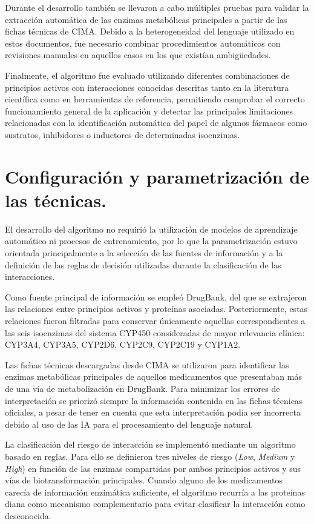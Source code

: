 Durante el desarrollo también se llevaron a cabo múltiples pruebas para validar la extracción automática de las enzimas metabólicas principales a partir de las fichas técnicas de CIMA. Debido a la heterogeneidad del lenguaje utilizado en estos documentos, fue necesario combinar procedimientos automáticos con revisiones manuales en aquellos casos en los que existían ambigüedades.

Finalmente, el algoritmo fue evaluado utilizando diferentes combinaciones de principios activos con interacciones conocidas descritas tanto en la literatura científica como en herramientas de referencia, permitiendo comprobar el correcto funcionamiento general de la aplicación y detectar las principales limitaciones relacionadas con la identificación automática del papel de algunos fármacos como sustratos, inhibidores o inductores de determinadas isoenzimas.

\section{Configuración y parametrización de las técnicas.}

El desarrollo del algoritmo no requirió la utilización de modelos de aprendizaje automático ni procesos de entrenamiento, por lo que la parametrización estuvo orientada principalmente a la selección de las fuentes de información y a la definición de las reglas de decisión utilizadas durante la clasificación de las interacciones.

Como fuente principal de información se empleó DrugBank, del que se extrajeron las relaciones entre principios activos y proteínas asociadas. Posteriormente, estas relaciones fueron filtradas para conservar únicamente aquellas correspondientes a las seis isoenzimas del sistema CYP450 consideradas de mayor relevancia clínica: CYP3A4, CYP3A5, CYP2D6, CYP2C9, CYP2C19 y CYP1A2.

Las fichas técnicas descargadas desde CIMA se utilizaron para identificar las enzimas metabólicas principales de aquellos medicamentos que presentaban más de una vía de metabolización en DrugBank. Para minimizar los errores de interpretación se priorizó siempre la información contenida en las fichas técnicas oficiales, a pesar de tener en cuenta que esta interpretación podía ser incorrecta debido al uso de las IA para el procesamiento del lenguaje natural.

La clasificación del riesgo de interacción se implementó mediante un algoritmo basado en reglas. Para ello se definieron tres niveles de riesgo (\textit{Low}, \textit{Medium} y \textit{High}) en función de las enzimas compartidas por ambos principios activos y sus vías de biotransformación principales. Cuando alguno de los medicamentos carecía de información enzimática suficiente, el algoritmo recurría a las proteínas diana como mecanismo complementario para evitar clasificar la interacción como desconocida.

